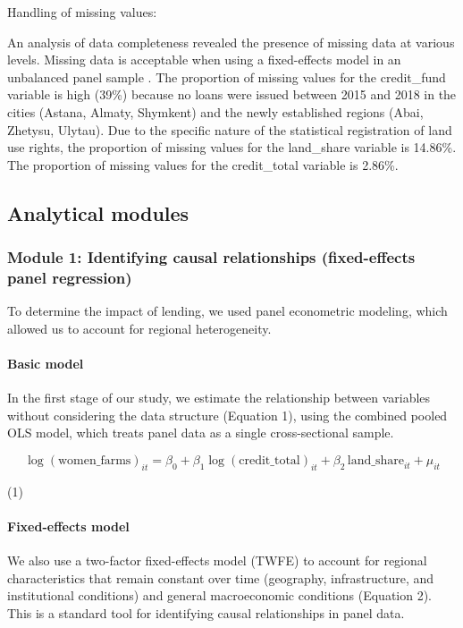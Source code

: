 \documentclass[pdflatex,sn-mathphys-ay]{sn-jnl}
\begin{document}
Handling of missing values:

An analysis of data completeness revealed the presence of missing data
at various levels. Missing data is acceptable when using a fixed-effects
model in an unbalanced panel sample \citep{ref100}. The
proportion of missing values for the credit\_fund variable is high
(39\%) because no loans were issued between 2015 and 2018 in the cities
(Astana, Almaty, Shymkent) and the newly established regions (Abai,
Zhetysu, Ulytau). Due to the specific nature of the statistical
registration of land use rights, the proportion of missing values for
the land\_share variable is 14.86\%. The proportion of missing values
for the credit\_total variable is 2.86\%.

\subsection{Analytical modules}

\subsubsection{Module 1: Identifying causal relationships (fixed-effects panel regression)}

To determine the impact of lending, we used panel econometric modeling,
which allowed us to account for regional heterogeneity.

\paragraph{Basic model}

In the first stage of our study, we estimate the relationship between
variables without considering the data structure (Equation 1), using the
combined pooled OLS model, which treats panel data as a single
cross-sectional sample.

$$
\log(\text{women\_farms})_{it} = \beta_0 + \beta_1 \log(\text{credit\_total})_{it} + \beta_2 \, \text{land\_share}_{it} + \mu_{it}
$$

(1)

\paragraph{Fixed-effects model}

We also use a two-factor fixed-effects model (TWFE) to account for
regional characteristics that remain constant over time (geography,
infrastructure, and institutional conditions) and general macroeconomic
conditions (Equation 2). This is a standard tool for identifying causal
relationships in panel data.
\end{document}
